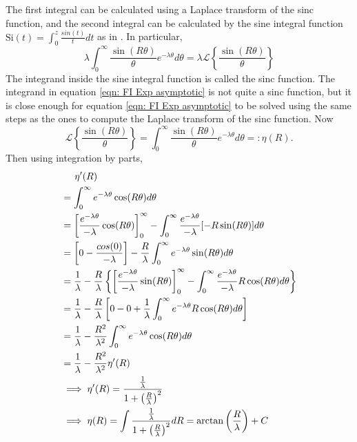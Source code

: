 \documentclass[%
 reprint,
 amsmath,amssymb,
 aps,
]{revtex4-2}
\begin{document}
The first integral  can be calculated using a Laplace transform of the sinc function, and the second integral can be calculated by the sine integral function $\text{Si}(t)=\int_0^z \frac{sin(t)}{t}dt$ as in \cite{rotiroti2022computing}. In particular,
\begin{equation} \label{eqn: FI Exp asymptotic}
     \lambda \int_0^\infty \frac{\sin(R\theta)}{\theta} e^{-\lambda \theta} d\theta = \lambda \mathcal{L}\left\{\frac{\sin(R\theta)}{\theta} \right\} %
\end{equation}
The integrand inside the sine integral function is called the sinc function. The integrand in equation \eqref{eqn: FI Exp asymptotic} is not quite a sinc function, but it is close enough for equation \eqref{eqn: FI Exp asymptotic} to be solved using the same steps as the ones to compute the Laplace transform of the sinc function. Now
\begin{equation} \label{eqn: Laplace transform eta function}
    \mathcal{L}\left\{\frac{\sin(R\theta)}{\theta}\right\} = \int_0^\infty \frac{\sin(R\theta)}{\theta} e^{-\lambda \theta} d\theta =: \eta(R).
\end{equation}
Then using integration by parts,
\begin{align*}
    & \hspace{0.5cm} \eta'(R) \\
    & = \int_0^\infty e^{-\lambda \theta} \cos(R\theta) d\theta\\
    & = \left[\frac{e^{-\lambda\theta}}{-\lambda}\cos(R\theta) \right]_0^\infty - \int_0^\infty \frac{e^{-\lambda\theta}}{-\lambda}[-R\sin(R\theta)]d\theta \\
    & = \left[0-\frac{cos(0)}{-\lambda} \right] - \frac{R}{\lambda}\int_0^\infty e^{-\lambda\theta}\sin(R\theta)d\theta\\
    & = \frac{1}{\lambda} - \frac{R}{\lambda}\left\{\left[\frac{e^{-\lambda\theta}}{-\lambda}\sin(R\theta) \right]_0^\infty - \int_0^\infty \frac{e^{-\lambda\theta}}{-\lambda}R\cos(R\theta)d\theta \right\}\\
    & = \frac{1}{\lambda} - \frac{R}{\lambda}\left[0 - 0 + \frac{1}{\lambda}\int_0^\infty e^{-\lambda\theta}R\cos(R\theta) d\theta \right] \\
    & = \frac{1}{\lambda} - \frac{R^2}{\lambda^2}\int_0^\infty e^{-\lambda\theta} \cos(R\theta) d\theta \\
    & = \frac{1}{\lambda} - \frac{R^2}{\lambda^2} \eta'(R)\\
    & \implies \eta'(R) = \frac{\frac{1}{\lambda}}{1 + \left(\frac{R}{\lambda} \right)^2}\\
    & \implies \eta(R) = \int \frac{\frac{1}{\lambda}}{1 + \left(\frac{R}{\lambda} \right)^2} dR = \arctan\left(\frac{R}{\lambda} \right) + C
\end{align*}
\end{document}
